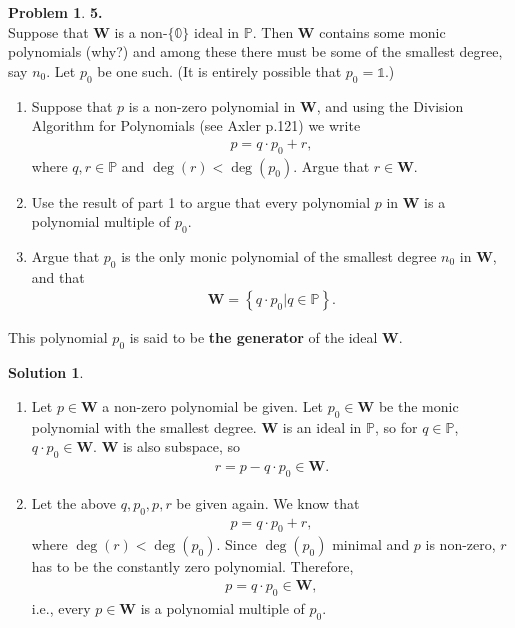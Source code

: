 \documentclass{article}
\theoremstyle{definition}
\newtheorem*{prob*}{Problem}
\newtheorem*{sln*}{Solution}
\newcommand{\W}{\mathbf{W}}
\begin{document}
\begin{prob*}\textbf{5.}\\
	
	Suppose that $\W$ is a non-$\{\mathbb{0}\}$ ideal in $\mathbb{P}$. Then $\W$ contains some monic polynomials (why?) and among these there must be some of the smallest degree, say $n_0$. Let $p_0$ be one such. (It is entirely possible that $p_0 = \mathbb{1}$.)
	\begin{enumerate}
		\item Suppose that $p$ is a non-zero polynomial in $\W$, and using the Division Algorithm for Polynomials (see Axler p.121) we write
		\begin{align*}
		p = q \cdot p_0+ r,
		\end{align*}
		where $q,r \in \mathbb{P}$ and $\deg(r) < \deg(p_0)$. Argue that $r\in \W$.
		\item Use the result of part 1 to argue that every polynomial $p$ in $\W$ is a polynomial multiple of $p_0$.
		\item Argue that $p_0$ is the only monic polynomial of the smallest degree $n_0$ in $\W$, and that
		\begin{align*}
		\W= \left\{ q\cdot p_0 \big\vert q \in \mathbb{P} \right\}.
		\end{align*}
	\end{enumerate}
This polynomial $p_0$ is said to be \textbf{the generator} of the ideal $\W$.

\begin{sln*}
	$\,$
	\begin{enumerate}
		\item Let $p \in \W$ a non-zero polynomial be given. Let $p_0 \in \W$ be the monic polynomial with the smallest degree. $\W$ is an ideal in $\mathbb{P}$, so for $q \in \mathbb{P}$, $q \cdot p_0 \in \W$. $\W$ is also subspace, so
		\begin{align*}
		r = p - q \cdot p_0 \in \W.
		\end{align*}
		
		\item Let the above $q,p_0,p, r$ be given again. We know that
		\begin{align*}
		p = q\cdot p_0 + r,
		\end{align*}  
		where $\deg(r) < \deg(p_0)$. Since $\deg(p_0)$ minimal and $p$ is non-zero, $r$ has to be the constantly zero polynomial. Therefore,
		\begin{align*}
		p = q\cdot p_0 \in \W,
		\end{align*} 
		i.e., every $p\in \W$ is a polynomial multiple of $p_0$.\\
		

\end{enumerate}
\end{sln*}
\end{prob*}
\end{document}
